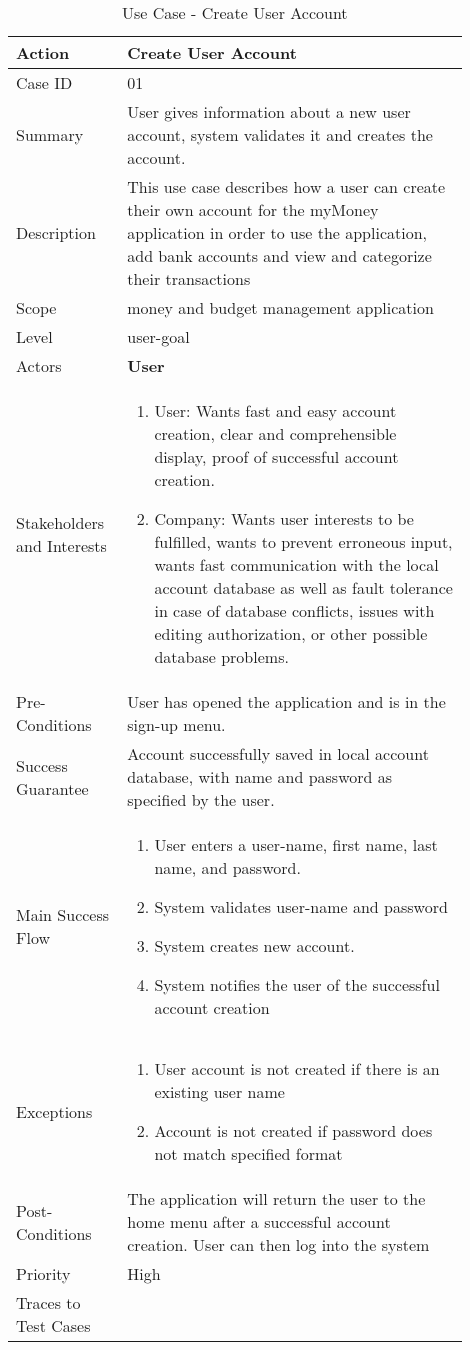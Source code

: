 \documentclass[11pt]{article}
\newcounter{use case ID}
\newcommand\tabularhead[1]{
    \begin{table}[ht]
        \addtocounter{use case ID}{1}
        \caption{Use Case \arabic{use case ID} - #1}
        \vspace{0.2cm}
        \begin{tabular}{|p{0.2\linewidth}|p{0.70\linewidth}|}
            \hline
            \textbf{Action} & \textbf{#1} \\
            \hline}
\newcommand\addrow[2]{#1 & #2\\ \hline}
\newcommand\addmulrow[2]{ \begin{minipage}[t][][t]{2.5cm}#1\end{minipage}
                &\begin{minipage}[t][][t]{11cm}
                    \begin{enumerate}[itemsep=-1ex] #2   \end{enumerate}
                \end{minipage}\vfill\\ \hline}
\newenvironment{usecase}{\tabularhead}
        {\hline\end{tabular}\end{table}}
\begin{document}
\begin{usecase}{Create User Account}
    \addrow{Case ID}{01}
    \addrow{Summary}{User gives information about a new user account, system validates it and creates the account.}
    \addrow{Description} {This use case describes how a user can create their own account for the myMoney application in order to use the application, add bank accounts and view and categorize their transactions}
    \addrow{Scope}{money and budget management application}
    \addrow{Level}{user-goal}
    \addrow{Actors}{\textbf{User}}
    \addmulrow{Stakeholders and Interests}{
    \item User: Wants fast and easy account creation, clear and comprehensible display, proof of successful account creation.
    \item Company: Wants user interests to be fulfilled, wants to prevent erroneous input, wants fast communication with the local account database as well as fault tolerance in case of database conflicts, issues with editing authorization, or other possible database problems.}
    \addrow{Pre-Conditions}{User has opened the application and is in the sign-up menu.}
    \addrow{Success Guarantee}{Account successfully saved in local account database, with name and password as specified by the user.}
    \addmulrow{Main Success Flow}{
    \item User enters a user-name, first name, last name, and password.
    \item System validates user-name and password
    \item System creates new account.
    \item System notifies the user of the successful account creation}
    \addmulrow{Exceptions}{
    \item User account is not created if there is an existing user name
    \item Account is not created if password does not match specified format}
    \addrow{Post-Conditions}{The application will return the user to the home menu after a successful account creation. User can then log into the system  }
    \addrow{Priority}{High}
    \addrow{Traces to Test Cases}{}
\end{usecase}
\end{document}
